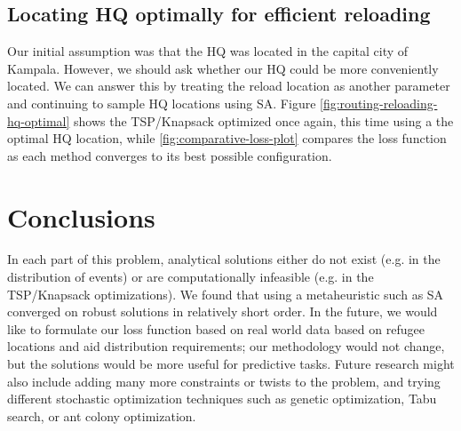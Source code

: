 \documentclass[a0,final]{a0poster}
\begin{document}
\begin{multicols}{3}
\vspace{-15mm}

\subsection*{Locating HQ optimally for efficient reloading}

\vspace{-6mm}

Our initial assumption was that the HQ was located in the capital city of Kampala. However, we should ask whether our HQ could be more conveniently located. We can answer this by treating the reload location as another parameter and continuing to sample HQ locations using SA. Figure \ref{fig:routing-reloading-hq-optimal} shows the TSP/Knapsack optimized once again, this time using a the optimal HQ location, while \ref{fig:comparative-loss-plot} compares the loss function as each method converges to its best possible configuration.

\vspace{-6mm}

\section*{Conclusions}

\vspace{-6mm}

In each part of this problem, analytical solutions either do not exist (e.g. in the distribution of events) or are computationally infeasible (e.g. in the TSP/Knapsack optimizations).  We found that using a metaheuristic such as SA converged on robust solutions in relatively short order. In the future, we would like to formulate our loss function based on real world data based on refugee locations and aid distribution requirements; our methodology would not change, but the solutions would be more useful for predictive tasks. Future research might also include adding many more constraints or twists to the problem, and trying different stochastic optimization techniques such as genetic optimization, Tabu search, or ant colony optimization.

\vspace{-6mm}




\end{multicols}
\end{document}

